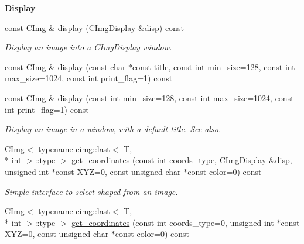 \begin{Indent}{\bf Display}\par
\begin{DoxyCompactItemize}
\item 
\hypertarget{structcimg__library_1_1_c_img_aab8c37b9dc626927623f68759fe83e83}{const \hyperlink{structcimg__library_1_1_c_img}{C\-Img} \& \hyperlink{structcimg__library_1_1_c_img_aab8c37b9dc626927623f68759fe83e83}{display} (\hyperlink{structcimg__library_1_1_c_img_display}{C\-Img\-Display} \&disp) const }\label{structcimg__library_1_1_c_img_aab8c37b9dc626927623f68759fe83e83}

\begin{DoxyCompactList}\small\item\em Display an image into a \hyperlink{structcimg__library_1_1_c_img_display}{C\-Img\-Display} window. \end{DoxyCompactList}\item 
const \hyperlink{structcimg__library_1_1_c_img}{C\-Img} \& \hyperlink{structcimg__library_1_1_c_img_aaa7358f1301586d38e99c0c46977623d}{display} (const char $\ast$const title, const int min\-\_\-size=128, const int max\-\_\-size=1024, const int print\-\_\-flag=1) const 
\item 
const \hyperlink{structcimg__library_1_1_c_img}{C\-Img} \& \hyperlink{structcimg__library_1_1_c_img_a906fbd50f469de50193b4be243e22478}{display} (const int min\-\_\-size=128, const int max\-\_\-size=1024, const int print\-\_\-flag=1) const 
\begin{DoxyCompactList}\small\item\em Display an image in a window, with a default title. See also. \end{DoxyCompactList}\item 
\hyperlink{structcimg__library_1_1_c_img}{C\-Img}$<$ typename \hyperlink{structcimg__library_1_1cimg_1_1last}{cimg\-::last}$<$ T, \\*
int $>$\-::type $>$ \hyperlink{structcimg__library_1_1_c_img_a1f77ac52b556d72fb2fa883209bf4af8}{get\-\_\-coordinates} (const int coords\-\_\-type, \hyperlink{structcimg__library_1_1_c_img_display}{C\-Img\-Display} \&disp, unsigned int $\ast$const X\-Y\-Z=0, const unsigned char $\ast$const color=0) const 
\begin{DoxyCompactList}\small\item\em Simple interface to select shaped from an image. \end{DoxyCompactList}\item 
\hypertarget{structcimg__library_1_1_c_img_a9a8bb0d6ca24878b4ec6cf645f51ec12}{\hyperlink{structcimg__library_1_1_c_img}{C\-Img}$<$ typename \hyperlink{structcimg__library_1_1cimg_1_1last}{cimg\-::last}$<$ T, \\*
int $>$\-::type $>$ \hyperlink{structcimg__library_1_1_c_img_a9a8bb0d6ca24878b4ec6cf645f51ec12}{get\-\_\-coordinates} (const int coords\-\_\-type=0, unsigned int $\ast$const X\-Y\-Z=0, const unsigned char $\ast$const color=0) const }\label{structcimg__library_1_1_c_img_a9a8bb0d6ca24878b4ec6cf645f51ec12}


\end{DoxyCompactItemize}
\end{Indent}
